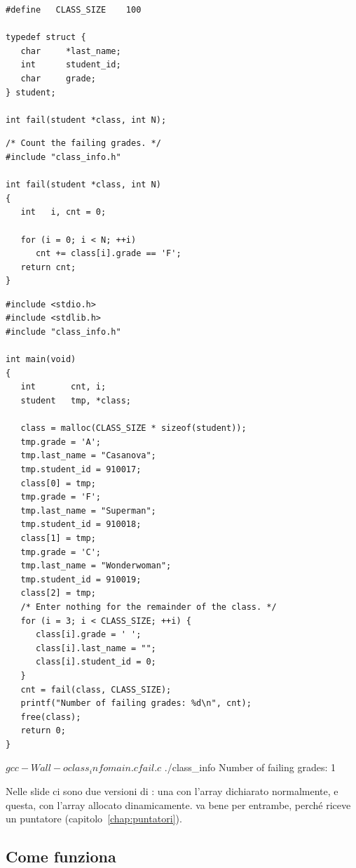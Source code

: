 \begin{affianco}[0.5][t]
\begin{lstlisting}[style=h, name=class_info.h]
#define   CLASS_SIZE    100

typedef struct {
   char     *last_name;
   int      student_id;
   char     grade;
} student;

int fail(student *class, int N);
\end{lstlisting}
\begin{lstlisting}[style=c, name=fail.c]
/* Count the failing grades. */
#include "class_info.h"

int fail(student *class, int N)
{
   int   i, cnt = 0;

   for (i = 0; i < N; ++i)
      cnt += class[i].grade == 'F';
   return cnt;
}
\end{lstlisting}
\risultato
\begin{lstlisting}[style=c, name=main.c]
#include <stdio.h>
#include <stdlib.h>
#include "class_info.h"

int main(void)
{
   int       cnt, i;
   student   tmp, *class;

   class = malloc(CLASS_SIZE * sizeof(student));
   tmp.grade = 'A';
   tmp.last_name = "Casanova";
   tmp.student_id = 910017;
   class[0] = tmp;
   tmp.grade = 'F';
   tmp.last_name = "Superman";
   tmp.student_id = 910018;
   class[1] = tmp;
   tmp.grade = 'C';
   tmp.last_name = "Wonderwoman";
   tmp.student_id = 910019;
   class[2] = tmp;
   /* Enter nothing for the remainder of the class. */
   for (i = 3; i < CLASS_SIZE; ++i) {
      class[i].grade = ' ';
      class[i].last_name = "";
      class[i].student_id = 0;
   }
   cnt = fail(class, CLASS_SIZE);
   printf("Number of failing grades: %d\n", cnt);
   free(class);
   return 0;
}
\end{lstlisting}
\end{affianco}

\begin{affianco}[0.5][c]
\begin{console}
$ gcc -Wall -o class_info main.c fail.c
$ ./class_info
Number of failing grades: 1
\end{console}
\risultato
Nelle slide ci sono due versioni di : una con l'array
 dichiarato normalmente, e questa, con
l'array allocato dinamicamente.  va bene per entrambe, perché
riceve un puntatore (capitolo~\ref{chap:puntatori}).
\end{affianco}

\subsection{Come funziona}

